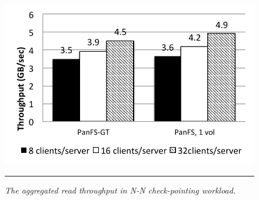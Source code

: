 \begin{figure}[t]  %
\centerline{\includegraphics[scale=0.7]{./figs/checkpointing_read}}
\vspace{10pt}
\caption{\footnotesize
\textit{
The aggregated read throughput in N-N check-pointing workload.
}
}
\hrule
\label{graph:checkpoint_read}
\end{figure}       %

